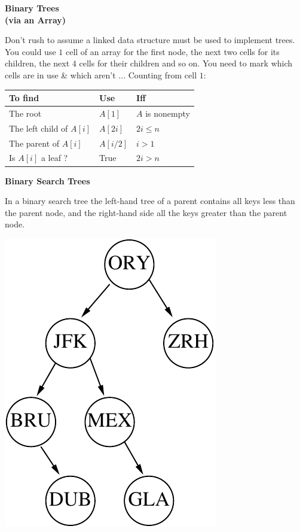 \newpage	
{\samepage	
\begin{center}	
{\Large{\bf Binary Trees\\[1.75ex]{\small(via an Array)}}}	
\end{center}	
Don't rush to assume a linked data structure must be used to implement	
trees. You could use $1$ cell of an array for the first node, the next	
two cells for its children, the next $4$ cells for their children and	
so on. You need to mark which cells are in use \& which aren't ...	
Counting from cell $1$:	

\begin{center}	
\begin{tabular}{|l|l|l|}\hline	
To find & Use & Iff\\ \hline	
The root & $A[1]$ & $A$ is nonempty \\	
The left child of $A[i]$ & $A[2i]$ & $2i \leq n$ \\	
The parent of $A[i]$ & $A[i/2]$ & $i > 1$\\	
Is $A[i]$ a leaf ? & True & $2i > n$\\ \hline	
\end{tabular}	
\end{center}	
}	



\newpage	
{\samepage	
\begin{center}	
{\Large{\bf Binary Search Trees}}	
\end{center}	
In a binary search tree the left-hand tree of a parent contains all keys less than the parent node,	
and the right-hand side all the keys greater than the parent node.	
\begin{center}	
\includegraphics{../Images/treeapt.pdf}	
\end{center}	
}	

